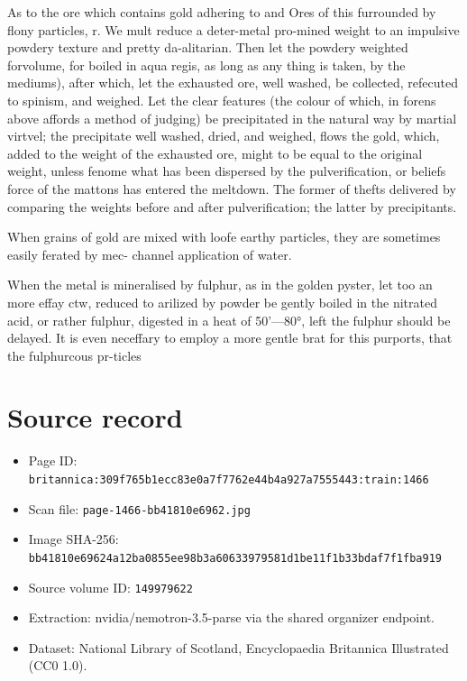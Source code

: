 \documentclass{article}
\begin{document}
As to the ore which contains gold adhering to and Ores of this furrounded by flony particles, r. We mult reduce a deter-metal pro-mined weight to an impulsive powdery texture and pretty da-alitarian. Then let the powdery weighted forvolume, for boiled in aqua regis, as long as any thing is taken, by the mediums), after which, let the exhausted ore, well washed, be collected, refecuted to spinism, and weighed. Let the clear features (the colour of which, in forens above affords a method of judging) be precipitated in the natural way by martial virtvel; the precipitate well washed, dried, and weighed, flows the gold, which, added to the weight of the exhausted ore, might to be equal to the original weight, unless fenome what has been dispersed by the pulverification, or beliefs force of the mattons has entered the meltdown. The former of thefts delivered by comparing the weights before and after pulverification; the latter by precipitants.

When grains of gold are mixed with loofe earthy particles, they are sometimes easily ferated by mec- channel application of water.

When the metal is mineralised by fulphur, as in the golden pyster, let too an more effay ctw, reduced to arilized by powder be gently boiled in the nitrated acid, or rather fulphur, digested in a heat of 50’—80°, left the fulphur should be delayed. It is even neceffary to employ a more gentle brat for this purports, that the fulphurcous pr-ticles

\section*{Source record}
\begin{itemize}
\item Page ID: \texttt{britannica:309f765b1ecc83e0a7f7762e44b4a927a7555443:train:1466}
\item Scan file: \texttt{page-1466-bb41810e6962.jpg}
\item Image SHA-256: \texttt{bb41810e69624a12ba0855ee98b3a60633979581d1be11f1b33bdaf7f1fba919}
\item Source volume ID: \texttt{149979622}
\item Extraction: nvidia/nemotron-3.5-parse via the shared organizer endpoint.
\item Dataset: National Library of Scotland, Encyclopaedia Britannica Illustrated (CC0 1.0).
\end{itemize}
\end{document}
